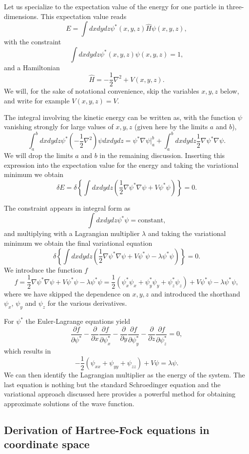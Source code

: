 \documentclass[%
oneside,                 %
final,                   %
10pt]{article}
\begin{document}
Let us specialize to the expectation value of the energy for one particle in three-dimensions.
This expectation value reads
\[
  E=\int dxdydz \psi^*(x,y,z) \hat{H} \psi(x,y,z),
\]
with the constraint
\[
 \int dxdydz \psi^*(x,y,z) \psi(x,y,z)=1,
\]
and a Hamiltonian
\[
\hat{H}=-\frac{1}{2}\nabla^2+V(x,y,z).
\]
We will, for the sake of notational convenience,  skip the variables $x,y,z$ below, and write for example $V(x,y,z)=V$.

The integral involving the kinetic energy can be written as, with the function $\psi$ vanishing
strongly for large values of $x,y,z$ (given here by the limits $a$ and $b$), 
 \[
  \int_a^b dxdydz \psi^* \left(-\frac{1}{2}\nabla^2\right) \psi dxdydz = \psi^*\nabla\psi|_a^b+\int_a^b dxdydz\frac{1}{2}\nabla\psi^*\nabla\psi.
\]
We will drop the limits $a$ and $b$ in the remaining discussion. 
Inserting this expression into the expectation value for the energy and taking the variational minimum  we obtain
\[
\delta E = \delta \left\{\int dxdydz\left( \frac{1}{2}\nabla\psi^*\nabla\psi+V\psi^*\psi\right)\right\} = 0.
\]

The constraint appears in integral form as 
\[
 \int dxdydz \psi^* \psi=\mathrm{constant},
\]
and multiplying with a Lagrangian multiplier $\lambda$ and taking the variational minimum we obtain the final variational equation
\[
\delta \left\{\int dxdydz\left( \frac{1}{2}\nabla\psi^*\nabla\psi+V\psi^*\psi-\lambda\psi^*\psi\right)\right\} = 0.
\]
We introduce the function  $f$
\[
  f =  \frac{1}{2}\nabla\psi^*\nabla\psi+V\psi^*\psi-\lambda\psi^*\psi=
\frac{1}{2}(\psi^*_x\psi_x+\psi^*_y\psi_y+\psi^*_z\psi_z)+V\psi^*\psi-\lambda\psi^*\psi,
\]
where we have skipped the dependence on $x,y,z$ and introduced the shorthand $\psi_x$, $\psi_y$ and $\psi_z$  for the various derivatives.

For $\psi^*$ the Euler-Lagrange  equations yield
\[
\frac{\partial f}{\partial \psi^*}- \frac{\partial }{\partial x}\frac{\partial f}{\partial \psi^*_x}-\frac{\partial }{\partial y}\frac{\partial f}{\partial \psi^*_y}-\frac{\partial }{\partial z}\frac{\partial f}{\partial \psi^*_z}=0,
\] 
which results in 
\[
    -\frac{1}{2}(\psi_{xx}+\psi_{yy}+\psi_{zz})+V\psi=\lambda \psi.
\]
We can then identify the  Lagrangian multiplier as the energy of the system. The last equation is 
nothing but the standard 
Schroedinger equation and the variational  approach discussed here provides 
a powerful method for obtaining approximate solutions of the wave function.

\subsection*{Derivation of Hartree-Fock equations in coordinate space}
\end{document}
